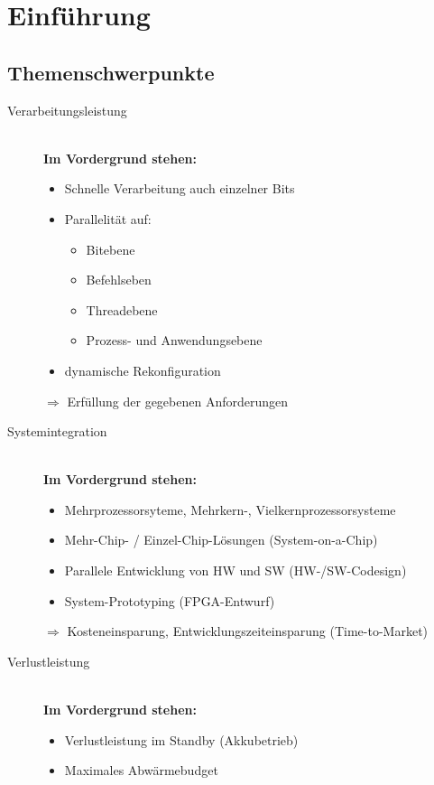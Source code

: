 \chapter{Einführung}
\section{Themenschwerpunkte}
	\begin{description}

		\item[Verarbeitungsleistung]\hfill
			\\\textbf{Im Vordergrund stehen:}
			\begin{itemize}
				\item Schnelle Verarbeitung auch einzelner Bits
				\item Parallelität auf: \hfill
				\begin{itemize}
					\item Bitebene
					\item Befehlseben
					\item Threadebene
					\item Prozess- und Anwendungsebene
				\end{itemize}
				\item dynamische Rekonfiguration
			\end{itemize}
			$\Rightarrow$ Erfüllung der gegebenen Anforderungen

		\item[Systemintegration]\hfill
			\\\textbf{Im Vordergrund stehen:}
			\begin{itemize}
				\item Mehrprozessorsyteme, Mehrkern-, Vielkernprozessorsysteme
				\item Mehr-Chip- / Einzel-Chip-Lösungen (System-on-a-Chip)
				\item Parallele Entwicklung von HW und SW
	(HW-/SW-Codesign)
				\item System-Prototyping (FPGA-Entwurf)
			\end{itemize}
			$\Rightarrow$ Kosteneinsparung, Entwicklungszeiteinsparung (Time-to-Market)

		\item[Verlustleistung]
			\hfill\\\textbf{Im Vordergrund stehen:}
			\begin{itemize}
				\item Verlustleistung im Standby (Akkubetrieb)
				\item Maximales Abwärmebudget
			\end{itemize}


\end{description}
